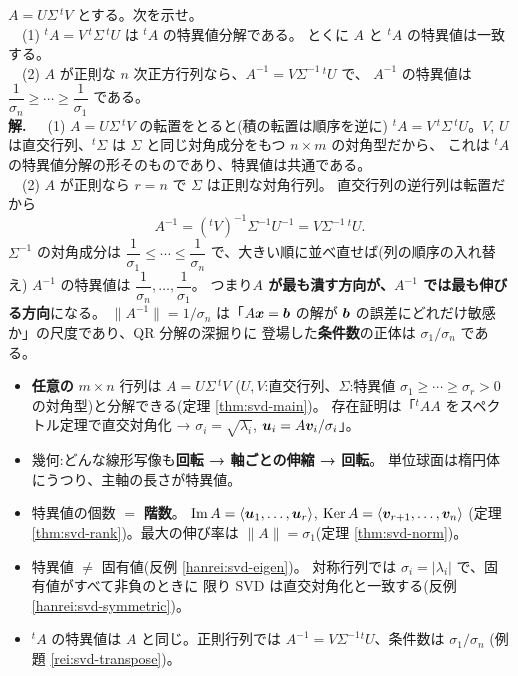 \begin{rei}[例題・標準(証明:転置と逆行列の特異値)]\label{rei:svd-transpose}
$A = U\Sigma\,{}^tV$ とする。次を示せ。\\
　(1) ${}^t\!A = V\,{}^t\Sigma\,{}^tU$ は ${}^t\!A$ の特異値分解である。
とくに $A$ と ${}^t\!A$ の特異値は一致する。\\
　(2) $A$ が正則な $n$ 次正方行列なら、$A^{-1} = V\Sigma^{-1}\,{}^tU$ で、
$A^{-1}$ の特異値は $\dfrac{1}{\sigma_n} \ge \cdots \ge \dfrac{1}{\sigma_1}$
である。\\
\textbf{解.}\
　(1) $A = U\Sigma\,{}^tV$ の転置をとると(積の転置は順序を逆に)
${}^t\!A = V\,{}^t\Sigma\,{}^tU$。$V$, $U$ は直交行列、${}^t\Sigma$ は
$\Sigma$ と同じ対角成分をもつ $n \times m$ の対角型だから、
これは ${}^t\!A$ の特異値分解の形そのものであり、特異値は共通である。\\
　(2) $A$ が正則なら $r = n$ で $\Sigma$ は正則な対角行列。
直交行列の逆行列は転置だから
\[
A^{-1} = ({}^tV)^{-1}\Sigma^{-1}U^{-1} = V\Sigma^{-1}\,{}^tU.
\]
$\Sigma^{-1}$ の対角成分は $\dfrac{1}{\sigma_1} \le \cdots \le
\dfrac{1}{\sigma_n}$ で、大きい順に並べ直せば(列の順序の入れ替え)
$A^{-1}$ の特異値は $\dfrac{1}{\sigma_n}, \dots, \dfrac{1}{\sigma_1}$。
つまり\textbf{$A$ が最も潰す方向が、$A^{-1}$ では最も伸びる方向}になる。
$\|A^{-1}\| = 1/\sigma_n$ は「$A\bm{x} = \bm{b}$ の解が
$\bm{b}$ の誤差にどれだけ敏感か」の尺度であり、QR 分解の深掘りに
登場した\textbf{条件数}の正体は $\sigma_1/\sigma_n$ である。
\end{rei}

\begin{matome}
\begin{itemize}
\item \textbf{任意の} $m \times n$ 行列は $A = U\Sigma\,{}^tV$
($U, V$:直交行列、$\Sigma$:特異値 $\sigma_1 \ge \cdots \ge \sigma_r > 0$
の対角型)と分解できる(定理 \ref{thm:svd-main})。
存在証明は「${}^t\!AA$ をスペクトル定理で直交対角化 →
$\sigma_i = \sqrt{\lambda_i}$, $\bm{u}_i = A\bm{v}_i/\sigma_i$」。
\item 幾何:どんな線形写像も\textbf{回転 → 軸ごとの伸縮 → 回転}。
単位球面は楕円体にうつり、主軸の長さが特異値。
\item 特異値の個数 $=$ \textbf{階数}。
$\mathrm{Im}\,A = \langle \bm{u}_1, \dots, \bm{u}_r \rangle$,
$\mathrm{Ker}\,A = \langle \bm{v}_{r+1}, \dots, \bm{v}_n \rangle$
(定理 \ref{thm:svd-rank})。最大の伸び率は
$\|A\| = \sigma_1$(定理 \ref{thm:svd-norm})。
\item 特異値 $\neq$ 固有値(反例 \ref{hanrei:svd-eigen})。
対称行列では $\sigma_i = |\lambda_i|$ で、固有値がすべて非負のときに
限り SVD は直交対角化と一致する(反例 \ref{hanrei:svd-symmetric})。
\item ${}^t\!A$ の特異値は $A$ と同じ。正則行列では
$A^{-1} = V\Sigma^{-1}{}^tU$、条件数は $\sigma_1/\sigma_n$
(例題 \ref{rei:svd-transpose})。
\end{itemize}
\end{matome}

